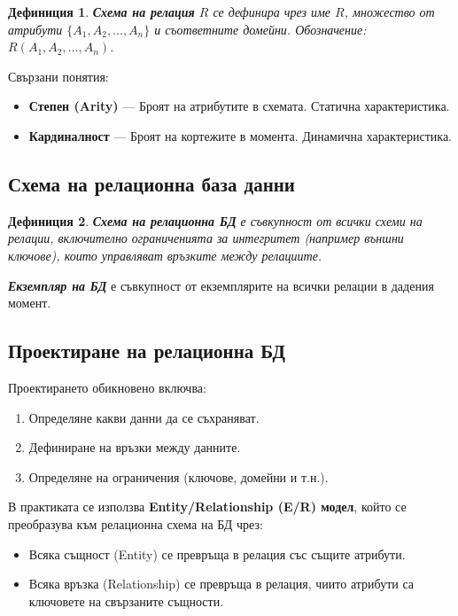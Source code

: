 \documentclass{scrartcl}
\newtheorem{definition}{Дефиниция}
\begin{document}
\begin{FlushLeft}
\begin{definition}
\textbf{\textit{Схема на релация}} $R$ се дефинира чрез име $R$, множество от атрибути $\{A_1, A_2, \ldots, A_n\}$ и съответните домейни. Обозначение: $R(A_1, A_2, \ldots, A_n)$.
\end{definition}

Свързани понятия:

\begin{itemize}
    \item \textbf{Степен (Arity)} --- Броят на атрибутите в схемата. Статична характеристика.
    \item \textbf{Кардиналност} --- Броят на кортежите в момента. Динамична характеристика.
\end{itemize}

\subsection{Схема на релационна база данни}

\begin{definition}
\textbf{\textit{Схема на релационна БД}} е съвкупност от всички схеми на релации, включително ограниченията за интегритет (например външни ключове), които управляват връзките между релациите.
\end{definition}

\textbf{\textit{Екземпляр на БД}} е съвкупност от екземплярите на всички релации в дадения момент.

\subsection{Проектиране на релационна БД}

Проектирането обикновено включва:

\begin{enumerate}
    \item Определяне какви данни да се съхраняват.
    \item Дефиниране на връзки между данните.
    \item Определяне на ограничения (ключове, домейни и т.н.).
\end{enumerate}

В практиката се използва \textbf{Entity/Relationship (E/R) модел}, който се преобразува към релационна схема на БД чрез:

\begin{itemize}
    \item Всяка същност (Entity) се превръща в релация със същите атрибути.
    \item Всяка връзка (Relationship) се превръща в релация, чиито атрибути са ключовете на свързаните същности.
\end{itemize}


\end{FlushLeft}
\end{document}
